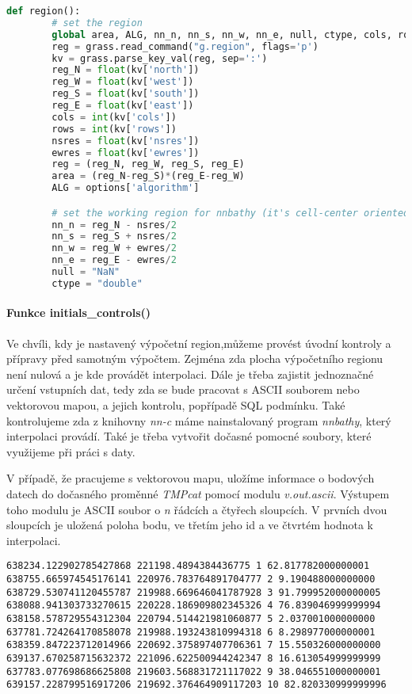 \documentclass[12pt,a4paper]{article}
\begin{document}
\begin{lstlisting}[language=python, caption={python version}]
    def region():
        # set the region
        global area, ALG, nn_n, nn_s, nn_w, nn_e, null, ctype, cols, rows
        reg = grass.read_command("g.region", flags='p')
        kv = grass.parse_key_val(reg, sep=':')
        reg_N = float(kv['north'])
        reg_W = float(kv['west'])
        reg_S = float(kv['south'])
        reg_E = float(kv['east'])
        cols = int(kv['cols'])
        rows = int(kv['rows'])
        nsres = float(kv['nsres'])
        ewres = float(kv['ewres'])
        reg = (reg_N, reg_W, reg_S, reg_E)
        area = (reg_N-reg_S)*(reg_E-reg_W)
        ALG = options['algorithm']

        # set the working region for nnbathy (it's cell-center oriented)
        nn_n = reg_N - nsres/2
        nn_s = reg_S + nsres/2
        nn_w = reg_W + ewres/2
        nn_e = reg_E - ewres/2
        null = "NaN"
        ctype = "double"
\end{lstlisting}

\paragraph{Funkce initials\_controls()}
Ve chvíli, kdy je nastavený výpočetní region,můžeme provést úvodní kontroly a přípravy před samotným výpočtem. Zejména zda plocha výpočetního regionu není nulová a je kde provádět interpolaci. Dále je třeba zajistit jednoznačné určení vstupních dat, tedy zda se bude pracovat s ASCII souborem nebo vektorovou mapou, a jejich kontrolu, popřípadě SQL podmínku. Také kontrolujeme zda z knihovny \textit{nn-c} máme nainstalovaný program \textit{nnbathy}, který interpolaci provádí. Také je třeba vytvořit dočasné pomocné soubory, které využijeme při práci s daty. 

V případě, že pracujeme s vektorovou mapu, uložíme informace o bodových datech do dočasného proměnné \textit{TMPcat} pomocí modulu \textit{v.out.ascii}. Výstupem toho modulu je ASCII soubor o \textit{n} řádcích a čtyřech sloupcích. V prvních dvou sloupcích je uložená poloha bodu, ve třetím jeho id a ve čtvrtém hodnota k interpolaci. 

\begin{lstlisting}
638234.122902785427868 221198.4894384436775 1 62.817782000000001
638755.665974545176141 220976.783764891704777 2 9.190488000000000
638729.530741120455787 219988.669646041787928 3 91.799952000000005
638088.941303733270615 220228.186909802345326 4 76.839046999999994
638158.578729554312304 220794.514421981060877 5 2.037001000000000
637781.724264170858078 219988.193243810994318 6 8.298977000000001
638359.847223712014966 220692.375897407706361 7 15.550326000000000
639137.670258715632372 221096.622500944242347 8 16.613054999999999
637783.077698686625808 219603.568831721117022 9 38.046551000000001
639157.228799516917206 219692.376464909117203 10 82.820330999999996
\end{lstlisting}
\end{document}
